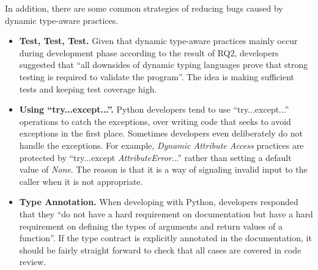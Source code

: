 In addition, there are some common strategies of reducing bugs caused by dynamic type-aware practices. 
\begin{itemize}
\item 
\textbf{Test, Test, Test.} Given that dynamic type-aware practices mainly occur during development phase according to the result of RQ2, developers suggested that ``all downsides of dynamic typing languages prove that strong testing is required to validate the program''. The idea is making sufficient tests and keeping test coverage high.
\item 
\textbf{Using ``try...except...''.} Python developers tend to use ``try...except...'' operations to catch the exceptions, over writing code that seeks to avoid exceptions in the first place. Sometimes developers even deliberately do not handle the exceptions.  For example, \emph{Dynamic Attribute Access} practices are protected by ``try...except \textit{AttributeError}...'' rather than setting a default value of \textit{None}. The reason is that it is a way of signaling invalid input to the caller when it is not appropriate.
\item 
\textbf{Type Annotation.} When developing with Python, developers responded that they ``do not have a hard requirement on documentation but have a hard requirement on defining the types of arguments and return values of a function''. If the type contract is explicitly annotated in the documentation, it should be fairly straight forward to check that all cases are covered in code review.
\end{itemize}